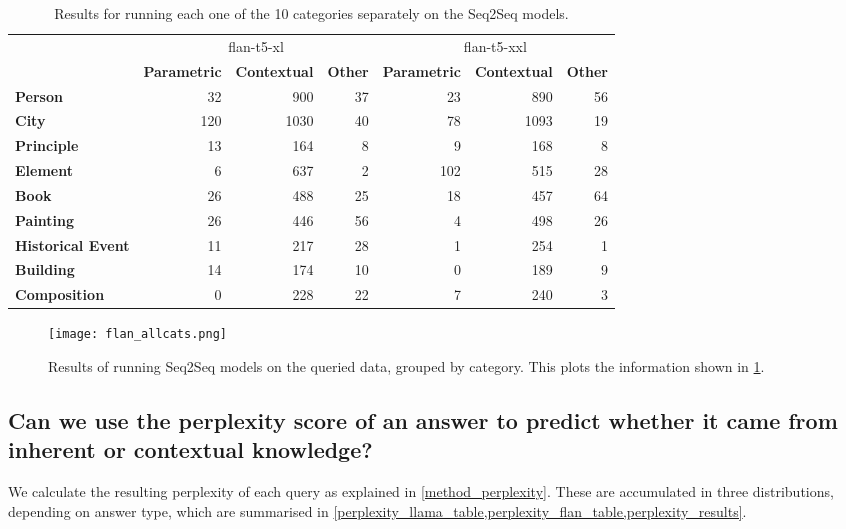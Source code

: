 \begin{table}[ht]
	\centering
	\footnotesize
	\begin{tabular}{>{\bfseries}l | r r r | r r r}
		\toprule
			& \multicolumn{3}{|c}{\ttfamily flan-t5-xl} & \multicolumn{3}{|c}{\ttfamily flan-t5-xxl} \\
			& \bfseries Parametric & \bfseries Contextual & \bfseries Other & \bfseries Parametric & \bfseries Contextual & \bfseries Other \\
		\midrule
			Person           &  32 &  900 & 37 &  23 &  890 & 56 \\
			City             & 120 & 1030 & 40 &  78 & 1093 & 19 \\
			Principle        &  13 &  164 &  8 &   9 &  168 &  8 \\
			Element          &   6 &  637 &  2 & 102 &  515 & 28 \\
			Book             &  26 &  488 & 25 &  18 &  457 & 64 \\
			Painting         &  26 &  446 & 56 &   4 &  498 & 26 \\
			Historical Event &  11 &  217 & 28 &   1 &  254 &  1 \\
			Building         &  14 &  174 & 10 &   0 &  189 &  9 \\
			Composition      &   0 &  228 & 22 &   7 &  240 &  3 \\
		\bottomrule
	\end{tabular}
	\caption{Results for running each one of the 10 categories separately on the Seq2Seq models.}
	\label{flan_cats_table}
\end{table}

\begin{figure}[p]
	\centering
	\texttt{[image: flan\_allcats.png]}
	\caption{Results of running Seq2Seq models on the queried data, grouped by category. This plots the information shown in \cref{flan_cats_table}.}
	\label{flan_cats_result}
\end{figure}

\newpage{}

\subsection{Can we use the perplexity score of an answer to predict whether it came from inherent or contextual knowledge?}
\label{results_perplexity_score}

We calculate the resulting perplexity of each query as explained in \cref{method_perplexity}.
These are accumulated in three distributions, depending on answer type, which are summarised in \cref{perplexity_llama_table,perplexity_flan_table,perplexity_results}.

